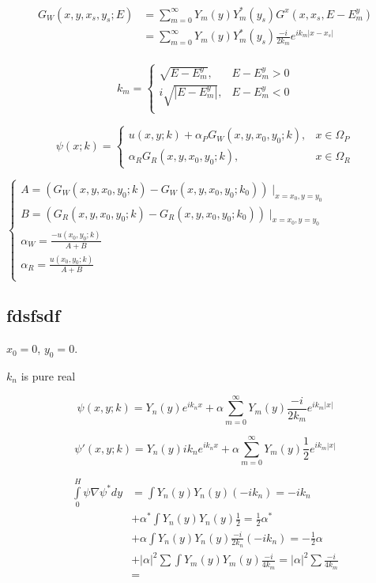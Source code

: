 \documentclass[12pt, a4paper]{article}
\begin{document}
\begin{align*}
G_W(x, y, x_s, y_s; E)
&= \sum\limits_{m = 0}^\infty Y_m(y) Y_m^*(y_s) G^x(x, x_s, E - E^y_m) \\
&= \sum\limits_{m = 0}^\infty Y_m(y) Y_m^*(y_s) \frac{-i}{2 k_m} e^{i k_m |x - x_s|} \\
\end{align*}

$$k_m =
\begin{cases}
\sqrt{E - E^y_m}, & E - E^y_m > 0 \\
i \sqrt{|E - E^y_m|}, & E - E^y_m < 0 \\
\end{cases}$$


$$\psi(x; k) =
\begin{cases}
u(x, y; k) + \alpha_P G_W(x, y, x_0, y_0; k), & x \in \Omega_P \\
\alpha_R G_R(x, y, x_0, y_0; k), & x \in \Omega_R
\end{cases}
$$

$\begin{cases}
A = (G_W(x, y, x_0, y_0; k) - G_W(x, y, x_0, y_0; k_0)) \mid_{x = x_0, y = y_0} \\
B = (G_R(x, y, x_0, y_0; k) - G_R(x, y, x_0, y_0; k_0)) \mid_{x = x_0, y = y_0} \\
\alpha_W = \frac{-u(x_0, y_0; k)}{A + B} \\
\alpha_R = \frac{u(x_0, y_0; k)}{A + B} \\
\end{cases}$

\subsection{fdsfsdf}
$x_0 = 0$, $y_0 = 0$.

$k_n$ is pure real

$$\psi(x, y; k) = Y_n(y) e^{i k_n x} + \alpha \sum\limits_{m = 0}^\infty Y_m(y) \frac{-i}{2 k_m} e^{i k_m |x|}$$

$$\psi'(x, y; k) = Y_n(y) i k_n e^{i k_n x} + \alpha \sum\limits_{m = 0}^\infty Y_m(y) \frac{1}{2 } e^{i k_m |x|}$$


\begin{align*}
\int\limits_{0}^H \psi \nabla \psi^* dy &=
   \int Y_n(y) Y_n(y) (-i k_n) = -i k_n \\
&+ \alpha^* \int Y_n(y) Y_n(y) \frac{1}{2}  = \frac{1}{2} \alpha^* \\
&+ \alpha \int Y_n(y) Y_n(y) \frac{-i}{2k_n}(-i k_n) =  -\frac{1}{2} \alpha \\
&+ |\alpha|^2 \sum \int Y_m(y) Y_m(y) \frac{-i}{4 k_m} = |\alpha|^2 \sum \frac{-i}{4 k_m}  \\
&= %
\end{align*}
\end{document}
